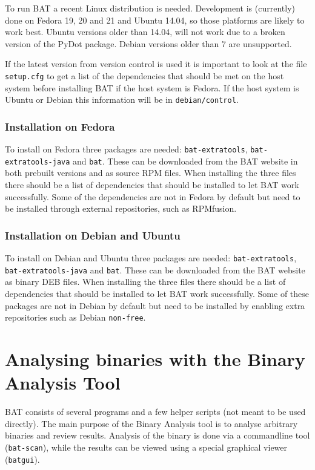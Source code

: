 \documentclass[10pt]{article}
\begin{document}
To run BAT a recent Linux distribution is needed. Development is (currently)
done on Fedora 19, 20 and 21 and Ubuntu 14.04, so those platforms are likely to
work best. Ubuntu versions older than 14.04, will not work due to a broken
version of the PyDot package. Debian versions older than 7 are unsupported.

If the latest version from version control is used it is important to look at
the file \texttt{setup.cfg} to get a list of the dependencies that should be
met on the host system before installing BAT if the host system is Fedora. If
the host system is Ubuntu or Debian this information will be in
\texttt{debian/control}.

\subsubsection{Installation on Fedora}

To install on Fedora three packages are needed:
\texttt{bat-extratools}, \texttt{bat-extratools-java} and \texttt{bat}. These
can be downloaded from the BAT website in both prebuilt versions and as source
RPM files. When installing the three files there should be a list of
dependencies that should be installed to let BAT work successfully. Some of
the dependencies are not in Fedora by default but need to be installed through
external repositories, such as RPMfusion.

\subsubsection{Installation on Debian and Ubuntu}

To install on Debian and Ubuntu three packages are needed:
\texttt{bat-extratools}, \texttt{bat-extratools-java} and \texttt{bat}. These
can be downloaded from the BAT website as binary DEB files. When installing the
three files there should be a list of dependencies that should be installed to
let BAT work successfully. Some of these packages are not in Debian by default
but need to be installed by enabling extra repositories such as Debian
\texttt{non-free}.

\section{Analysing binaries with the Binary Analysis Tool}

BAT consists of several programs and a few helper scripts (not meant to be
used directly). The main purpose of the Binary Analysis tool is to analyse
arbitrary binaries and review results. Analysis of the binary is done via
a commandline tool (\texttt{bat-scan}), while the results can be viewed using
a special graphical viewer (\texttt{batgui}).
\end{document}
